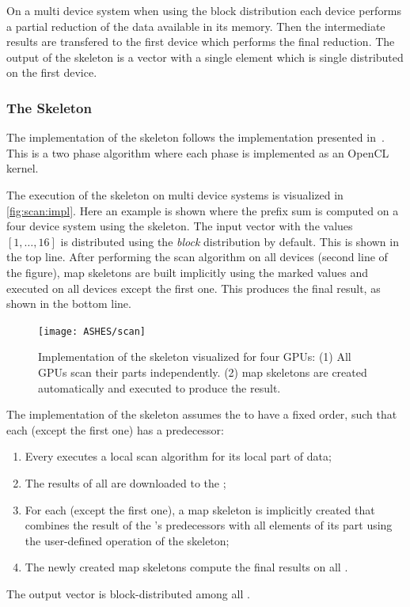 On a multi device system when using the block distribution each device performs a partial reduction of the data available in its memory.
Then the intermediate results are transfered to the first device which performs the final reduction.
The output of the \reduce skeleton is a vector with a single element which is single distributed on the first device.





\subsubsection{The \scan Skeleton}
The implementation of the \scan skeleton follows the implementation presented in~\cite{HarrisSeOw2007}.
This is a two phase algorithm where each phase is implemented as an OpenCL kernel.

The execution of the \scan skeleton on multi device systems is visualized in \autoref{fig:scan:impl}.
Here an example is shown where the prefix sum is computed on a four device system using the \scan skeleton.
The input vector with the values $[1,\ldots,16]$ is distributed using the \emph{block} distribution by default.
This is shown in the top line.
After performing the scan algorithm on all devices (second line of the figure), map skeletons are built implicitly using the marked values and executed on all devices except the first one.
This produces the final result, as shown in the bottom line.

\begin{figure}[tbp]
    \centering
    \texttt{[image: ASHES/scan]}
    \caption{Implementation of the \scan skeleton visualized for four GPUs:
            (1) All GPUs scan their parts independently.
            (2) map skeletons are created automatically and
             executed to produce the result.}
    \label{fig:scan:impl}
\end{figure}

The \SkelCL implementation of the \scan skeleton assumes the \GPUs to have a fixed order, such that each \GPU (except the first one) has a predecessor:
\begin{enumerate}
 \item Every \GPU executes a local scan algorithm for its local part of data;
 \item The results of all \GPUs are downloaded to the \CPU;
 \item For each \GPU (except the first one), a map skeleton is implicitly created that combines the result of the \GPU's predecessors with all elements of its part using the user-defined operation of the \scan skeleton;
 \item The newly created map skeletons compute the final results on all \GPUs.
\end{enumerate}
The output vector is block-distributed among all \GPUs.





